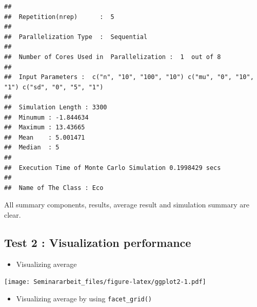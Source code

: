 \documentclass[11pt,a4paper]{article}
\newenvironment{Shaded}{\begin{snugshade}}{\end{snugshade}}
\newcommand{\AttributeTok}[1]{\textcolor[rgb]{0.77,0.63,0.00}{#1}}
\newcommand{\FunctionTok}[1]{\textcolor[rgb]{0.00,0.00,0.00}{#1}}
\newcommand{\NormalTok}[1]{#1}
\newcommand{\SpecialCharTok}[1]{\textcolor[rgb]{0.00,0.00,0.00}{#1}}
\begin{document}
\begin{verbatim}
## 
##  Repetition(nrep)      :  5 
## 
##  Parallelization Type  :  Sequential 
## 
##  Number of Cores Used in  Parallelization :  1  out of 8 
## 
##  Input Parameters :  c("n", "10", "100", "10") c("mu", "0", "10", "1") c("sd", "0", "5", "1") 
## 
##  Simulation Length : 3300 
##  Minumum : -1.844634 
##  Maximum : 13.43665 
##  Mean    : 5.001471 
##  Median  : 5 
## 
##  Execution Time of Monte Carlo Simulation 0.1998429 secs 
## 
##  Name of The Class : Eco
\end{verbatim}

All summary components, results, average result and simulation summary
are clear.

\hypertarget{test-2-visualization-performance}{%
\subsection{Test 2 : Visualization
performance}\label{test-2-visualization-performance}}

\begin{itemize}

\item
  Visualizing average
\end{itemize}

\begin{Shaded}
\end{Shaded}

\texttt{[image: Seminararbeit\_files/figure-latex/ggplot2-1.pdf]}

\begin{itemize}

\item
  Visualizing average by using \texttt{facet\_grid()}
\end{itemize}

\begin{Shaded}
\end{Shaded}
\end{document}
